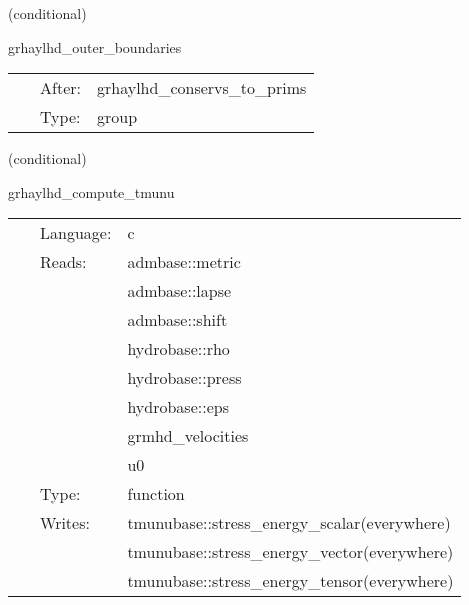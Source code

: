 \vspace{5mm}

   (conditional) 

\hspace{5mm} grhaylhd\_outer\_boundaries 

\hspace{5mm}{\it apply selected boundary conditions to the primitive variables } 


\hspace{5mm}

 \begin{tabular*}{160mm}{cll} 
~ & After:  & grhaylhd\_conservs\_to\_prims \\ 
~ & Type:  & group \\ 
\end{tabular*} 


\vspace{5mm}

   (conditional) 

\hspace{5mm} grhaylhd\_compute\_tmunu 

\hspace{5mm}{\it compute stress-energy tensor } 


\hspace{5mm}

 \begin{tabular*}{160mm}{cll} 
~ & Language:  & c \\ 
~ & Reads:  & admbase::metric \\ 
~& ~ &admbase::lapse\\ 
~& ~ &admbase::shift\\ 
~& ~ &hydrobase::rho\\ 
~& ~ &hydrobase::press\\ 
~& ~ &hydrobase::eps\\ 
~& ~ &grmhd\_velocities\\ 
~& ~ &u0\\ 
~ & Type:  & function \\ 
~ & Writes:  & tmunubase::stress\_energy\_scalar(everywhere) \\ 
~& ~ &tmunubase::stress\_energy\_vector(everywhere)\\ 
~& ~ &tmunubase::stress\_energy\_tensor(everywhere)\\ 
\end{tabular*} 


\vspace{5mm}

